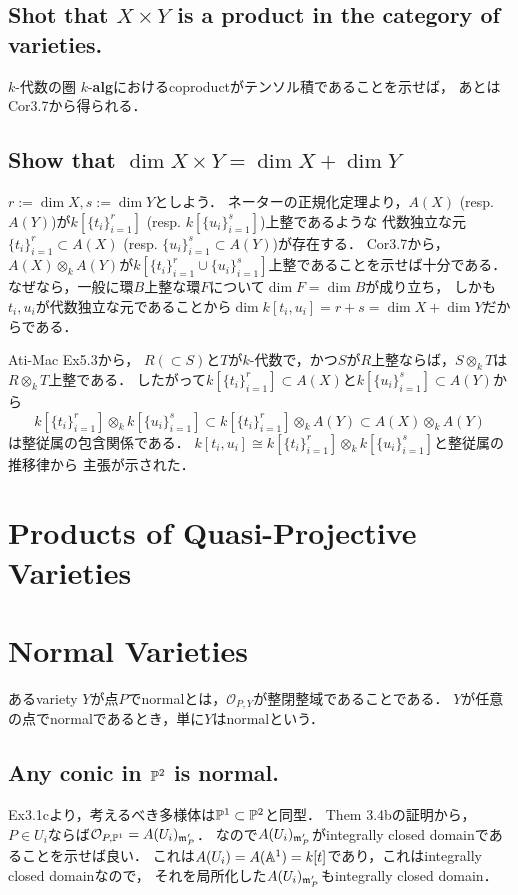 \documentclass[a4paper]{jarticle}
\begin{document}
    \subsection{Shot that $X \times Y$ is a product in the category of varieties.}
    $k$-代数の圏 $k$-\textbf{alg}におけるcoproductがテンソル積であることを示せば，
    あとはCor3.7から得られる．

    \subsection{Show that $\dim X \times Y=\dim X+\dim Y$}
    $r:=\dim X, s:=\dim Y$としよう．
    ネーターの正規化定理より，$A(X)$ (resp. $A(Y)$)が$k[\{t_i\}_{i=1}^{r}]$ (resp. $k[\{u_i\}_{i=1}^{s}]$)上整であるような
    代数独立な元$\{t_i\}_{i=1}^{r} \subset A(X)$ (resp. $\{u_i\}_{i=1}^{s} \subset A(Y)$)が存在する．
    Cor3.7から，$A(X) \otimes_k A(Y)$が$k[\{t_i\}_{i=1}^{r} \cup \{u_i\}_{i=1}^{s}]$上整であることを示せば十分である．
    なぜなら，一般に環$B$上整な環$F$について$\dim F=\dim B$が成り立ち，
    しかも$t_i, u_i$が代数独立な元であることから$\dim k[t_i,u_i]=r+s=\dim X+\dim Y$だからである．

    Ati-Mac Ex5.3から，
    $R (\subset S)$と$T$が$k$-代数で，かつ$S$が$R$上整ならば，$S \otimes_k T$は$R \otimes _k T$上整である．
    したがって$k[\{t_i\}_{i=1}^{r}] \subset A(X)$と$k[\{u_i\}_{i=1}^{s}] \subset A(Y)$から
    \[ k[\{t_i\}_{i=1}^{r}] \otimes_k k[\{u_i\}_{i=1}^{s}] \subset k[\{t_i\}_{i=1}^{r}] \otimes_k A(Y) \subset A(X) \otimes_k A(Y) \]
    は整従属の包含関係である．
    $k[t_i,u_i] \cong k[\{t_i\}_{i=1}^{r}] \otimes_k k[\{u_i\}_{i=1}^{s}]$と整従属の推移律から
    主張が示された．

\section{Products of Quasi-Projective Varieties} 

\section{Normal Varieties}
    あるvariety $Y$が点$P$でnormalとは，$\mathcal{O}_{P,Y}$が整閉整域であることである．
    $Y$が任意の点でnormalであるとき，単に$Y$はnormalという．

    \subsection{Any conic in $\mathbb{P}^2$ is normal.}
    Ex3.1cより，考えるべき多様体は$\mathbb{P}^1 \subset \mathbb{P}^2$と同型．
    Them 3.4bの証明から，$P \in U_i$ならば$\mathcal{O}_{P,\mathbb{P}^1}=A(U_i)_{\mathfrak{m}'_P}$．
    なので$A(U_i)_{\mathfrak{m}'_P}$がintegrally closed domainであることを示せば良い．
    これは$A(U_i)=A(\mathbb{A}^1)=k[t]$であり，これはintegrally closed domainなので，
    それを局所化した$A(U_i)_{\mathfrak{m}'_P}$もintegrally closed domain．
\end{document}
